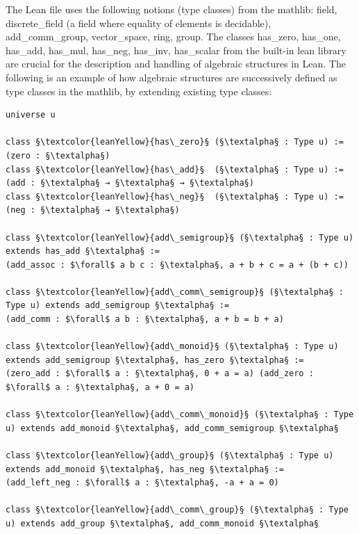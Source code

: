 \documentclass[11pt]{article}
\begin{document}
The Lean file uses the following notions (type classes) from the mathlib: {\lean field}, {\lean discrete\_field} (a field where equality of elements is decidable), {\lean add\_comm\_group}, {\lean vector\_space}, {\lean ring}, {\lean group}.
The classes {\lean has\_zero}, {\lean has\_one}, {\lean has\_add}, {\lean has\_mul}, {\lean has\_neg}, {\lean has\_inv}, {\lean has\_scalar} from the built-in lean library are crucial for the description and handling of algebraic structures in Lean.
The following is an example of how algebraic structures are successively defined as type classes in the mathlib, by extending existing type classes:
\begin{lstlisting}
universe u

class §\textcolor{leanYellow}{has\_zero}§ (§\textalpha§ : Type u) := (zero : §\textalpha§)
class §\textcolor{leanYellow}{has\_add}§  (§\textalpha§ : Type u) := (add : §\textalpha§ → §\textalpha§ → §\textalpha§)
class §\textcolor{leanYellow}{has\_neg}§  (§\textalpha§ : Type u) := (neg : §\textalpha§ → §\textalpha§)

class §\textcolor{leanYellow}{add\_semigroup}§ (§\textalpha§ : Type u) extends has_add §\textalpha§ :=
(add_assoc : $\forall$ a b c : §\textalpha§, a + b + c = a + (b + c))

class §\textcolor{leanYellow}{add\_comm\_semigroup}§ (§\textalpha§ : Type u) extends add_semigroup §\textalpha§ :=
(add_comm : $\forall$ a b : §\textalpha§, a + b = b + a)

class §\textcolor{leanYellow}{add\_monoid}§ (§\textalpha§ : Type u) extends add_semigroup §\textalpha§, has_zero §\textalpha§ :=
(zero_add : $\forall$ a : §\textalpha§, 0 + a = a) (add_zero : $\forall$ a : §\textalpha§, a + 0 = a)

class §\textcolor{leanYellow}{add\_comm\_monoid}§ (§\textalpha§ : Type u) extends add_monoid §\textalpha§, add_comm_semigroup §\textalpha§

class §\textcolor{leanYellow}{add\_group}§ (§\textalpha§ : Type u) extends add_monoid §\textalpha§, has_neg §\textalpha§ :=
(add_left_neg : $\forall$ a : §\textalpha§, -a + a = 0)

class §\textcolor{leanYellow}{add\_comm\_group}§ (§\textalpha§ : Type u) extends add_group §\textalpha§, add_comm_monoid §\textalpha§
\end{lstlisting}
\end{document}
